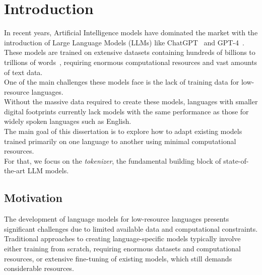 
\chapter{Introduction}


\label{Section1}

In recent years, Artificial Intelligence models have dominated the market with the introduction of Large Language Models (LLMs) like ChatGPT~\cite{Chat-GPT} and GPT-4~\cite{openai2023gpt4}.\\
These models are trained on extensive datasets containing hundreds of billions to trillions of words~\cite{brown2020language, touvron2023llama}, requiring enormous computational resources and vast amounts of text data.\\
One of the main challenges these models face is the lack of training data for low-resource languages.\\
Without the massive data required to create these models, languages with smaller digital footprints currently lack models with the same performance as those for widely spoken languages such as English.\\
The main goal of this dissertation is to explore how to adapt existing models trained primarily on one language to another using minimal computational resources.\\
For that, we focus on the \textit{tokenizer}, the fundamental building block of state-of-the-art LLM models.

\section{Motivation}\label{Section1.1}
The development of language models for low-resource languages presents significant challenges due to limited available data and computational constraints. Traditional approaches to creating language-specific models typically involve either training from scratch, requiring enormous datasets and computational resources, or extensive fine-tuning of existing models, which still demands considerable resources.

